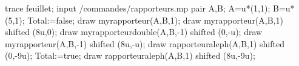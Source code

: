 \begin{exercice*}
    \begin{Geometrie}[CoinBG={(-3u,-12u)},CoinHD={(13u,5u)}]
        trace feuillet;
        input \persopath/commandes/rapporteurs.mp
        pair A,B;
        A=u*(1,1);
        B=u*(5,1);
        Total:=false;
        draw myrapporteur(A,B,1);
        draw myrapporteur(A,B,1) shifted (8u,0);
        draw myrapporteurdouble(A,B,-1) shifted (0,-u);
        draw myrapporteur(A,B,-1) shifted (8u,-u);
        draw rapporteuraleph(A,B,1) shifted (0,-9u);
        Total:=true;
        draw rapporteuraleph(A,B,1) shifted (8u,-9u);
    \end{Geometrie}
\end{exercice*}